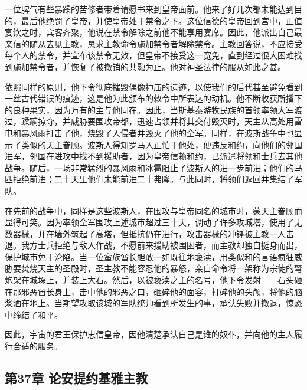一位脾气有些暴躁的苦修者带着请愿书来到皇帝面前。他来了好几次都未能达到目的，最后他绝罚了皇帝，并使皇帝处于禁令之下。这位信德的皇帝回到宫中，正值宴饮之时，宾客齐聚，他说在禁令解除之前他不能享用宴席。因此，他派出自己最亲信的随从去见主教，恳求主教命令施加禁令者解除禁令。主教回答说，不应接受每个人的禁令，并宣布该禁令无效，但皇帝不接受这一宽免，直到经过很大困难找到施加禁令者，并恢复了被撤销的共融为止。他对神圣法律的服从如此之甚。\par

依照同样的原则，他下令彻底摧毁偶像神庙的遗迹，以使我们的后代甚至避免看到一丝古代错误的痕迹，这是他为此颁布的敕令中所表达的动机。他不断收获所播下的良种果实，因为万有的主与他同在。因此，当斯基泰游牧民族的首领率领大军渡过，蹂躏掠夺，并威胁要围攻帝都，迅速占领并将其交付毁灭时，天主从高处用雷电和暴风雨打击了他，烧毁了入侵者并毁灭了他的全军。同样，在波斯战争中也显示了类似的天主眷顾。波斯人得知罗马人正忙于他处，便违反和约，向他们的邻国进军，邻国在进攻中找不到援助者，因为皇帝信赖和约，已派遣将领和士兵去其他战争。随后，一场非常猛烈的暴风雨和冰雹阻止了波斯人的进一步前进；他们的马匹拒绝前进；二十天里他们未能前进二十弗隆。与此同时，将领们返回并集结了军队。\par

在先前的战争中，同样是这些波斯人，在围攻与皇帝同名的城市时，蒙天主眷顾而显得可笑。因为率领全军围攻上述城市超过三十天，调动了许多攻城塔，使用了无数器械，并在墙外筑起了高塔，但抵抗仍在进行，攻击器械的冲锋被主教一人击退。我方士兵拒绝与敌人作战，不愿前来援助被围困者，而主教却独自挺身而出，保护城市免于沦陷。当一位蛮族酋长胆敢一如既往地亵渎，用类似和的言语疯狂威胁要焚烧天主的圣殿时，圣主教不能容忍他的暴怒，亲自命令将一架称为宗徒的弩炮架在城垛上，并装上大石。然后，以被亵渎之主的名号，他下令发射——石头砸在那邪恶酋长身上，击中他的邪恶之口，砸碎他的面容，打碎他的头颅，将他的脑浆洒在地上。当期望攻取该城的军队统帅看到所发生的事，承认失败并撤退，惊恐中缔结了和平。\par

因此，宇宙的君王保护忠信皇帝，因他清楚承认自己是谁的奴仆，并向他的主人履行合适的服务。\par


\subsection{第37章 论安提约基雅主教}

